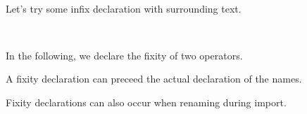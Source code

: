 \documentclass{article}
\begin{document}
\begin{code}%
\>[0]\AgdaSpace{}%
\AgdaSpace{}%
\<%
\\
%
\\[\AgdaEmptyExtraSkip]%
\>[0]\AgdaSpace{}%
\AgdaSpace{}%
\AgdaOperator{\AgdaDatatype{\AgdaUnderscore{}>>\AgdaUnderscore{}}}\AgdaSpace{}%
\AgdaOperator{\AgdaDatatype{\AgdaUnderscore{}<<\AgdaUnderscore{}}}\<%
\\
%
\\[\AgdaEmptyExtraSkip]%
\>[0]\AgdaSpace{}%
\AgdaOperator{\AgdaDatatype{\AgdaUnderscore{}>>\AgdaUnderscore{}}}\AgdaSpace{}%
\AgdaSymbol{:}\AgdaSpace{}%
\AgdaSpace{}%
\<%
\\
\>[0]\AgdaSpace{}%
\AgdaOperator{\AgdaDatatype{\AgdaUnderscore{}<<\AgdaUnderscore{}}}\AgdaSpace{}%
\AgdaSymbol{:}\AgdaSpace{}%
\AgdaSpace{}%
\<%
\\
\>[0]\<%
\end{code}

Let's try some infix declaration with surrounding text.

\begin{code}%
\>[0]\AgdaSpace{}%
\AgdaSpace{}%
\<%
\\
\>[0]\<%
\end{code}

In the following, we declare the fixity of two operators.

\begin{code}%
\>[0][@{}l@{\AgdaIndent{1}}]%
\>[2]\AgdaSpace{}%
\AgdaSpace{}%
\AgdaOperator{\AgdaPostulate{\AgdaUnderscore{}+\AgdaUnderscore{}}}\AgdaSpace{}%
\AgdaOperator{\AgdaPostulate{\AgdaUnderscore{}*\AgdaUnderscore{}}}\<%
\end{code}

A fixity declaration can preceed the actual declaration of the names.

\begin{code}%
%
\>[2]\AgdaSpace{}%
\AgdaOperator{\AgdaPostulate{\AgdaUnderscore{}+\AgdaUnderscore{}}}\AgdaSpace{}%
\AgdaOperator{\AgdaPostulate{\AgdaUnderscore{}*\AgdaUnderscore{}}}\AgdaSpace{}%
\AgdaSymbol{:}\AgdaSpace{}%
\<%
\end{code}

Fixity declarations can also occur when renaming during import.
\end{document}
